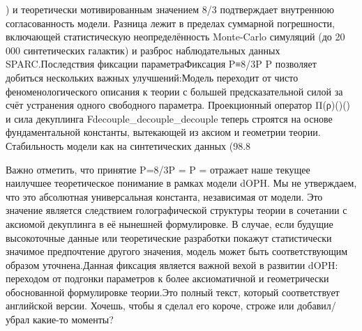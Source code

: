 ) и теоретически мотивированным значением 8/3
 подтверждает внутреннюю согласованность модели. Разница лежит в пределах суммарной погрешности, включающей статистическую неопределённость Monte-Carlo симуляций (до 20 000 синтетических галактик) и разброс наблюдательных данных SPARC.Последствия фиксации параметраФиксация P≡8/3P \equiv {}P \equiv {}
 позволяет добиться нескольких важных улучшений:Модель переходит от чисто феноменологического описания к теории с большей предсказательной силой за счёт устранения одного свободного параметра.
Проекционный оператор Π(ρ)\Pi(\rho)\Pi(\rho)
 и сила декуплинга Fdecouple_{\rm decouple}_{\rm decouple}
 теперь строятся на основе фундаментальной константы, вытекающей из аксиом и геометрии теории.
Стабильность модели как на синтетических данных (98.8 %

Важно отметить, что принятие P=8/3P = P = 
 отражает наше текущее наилучшее теоретическое понимание в рамках модели dOPH. Мы не утверждаем, что это абсолютная универсальная константа, независимая от модели. Это значение является следствием голографической структуры теории в сочетании с аксиомой декуплинга в её нынешней формулировке. В случае, если будущие высокоточные данные или теоретические разработки покажут статистически значимое предпочтение другого значения, модель может быть соответствующим образом уточнена.Данная фиксация является важной вехой в развитии dOPH: переходом от подгонки параметров к более аксиоматичной и геометрически обоснованной формулировке теории.Это полный текст, который соответствует английской версии.  Хочешь, чтобы я сделал его короче, строже или добавил/убрал какие-то моменты?

